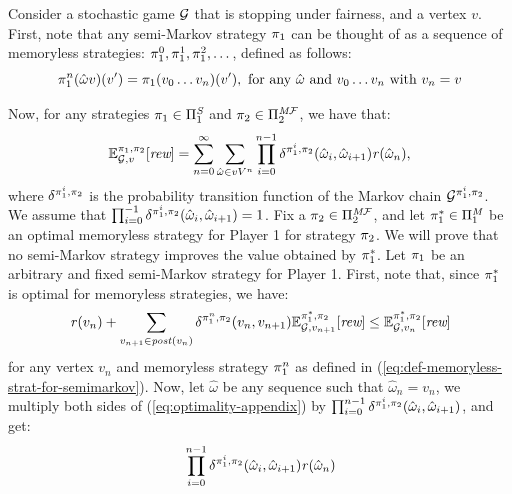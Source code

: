 \begin{myproof}
  Consider a stochastic game $\mathcal{G}$ that is stopping under fairness, and a vertex $v$. First, note that any semi-Markov strategy $\pi_{1}$ can be thought of as a  sequence of memoryless strategies: $\pi_{1}^{0},\pi_{1}^{1},\pi_{1}^{2}, \dots$,  defined as follows:
  \begin{equation}\label{eq:def-memoryless-strat-for-semimarkov}
    \pi_{1}^{n}(\hat{\omega}v)(v') = \pi_{1}(v_0 \dots v_n)(v'), \text{ for any $\hat{\omega}$ and $v_0 \dots v_n$ with $v_n = v$}
  \end{equation}

  Now,  for any strategies $\pi_{1} \in \Pi^{\textit{S}}_{1}$ and $\pi_{2} \in \Pi^{\textit{M}\mathcal{F}}_{2}$, we have that:
  \[
  \mathbb{E}^{\pi_{1}, \pi_{2}}_{\mathcal{G},v}[\textit{rew}] = 
  \sum^\infty_{n=0} \sum_{\hat{\omega} \in vV^n} \prod^{n-1}_{i=0} \delta^{\pi_{1}^i,\pi_{2}}(\hat{\omega}_i, \hat{\omega}_{i+1}) \mathit{r}(\hat{\omega}_n),
  \]
  where $\delta^{\pi_{1}^i,\pi_{2}}$ is the probability transition function of the Markov chain $\mathcal{G}^{\pi_{1}^i,\pi_{2}}$.  We assume that $\prod^{-1}_{i=0} \delta^{\pi_{1}^i,\pi_{2}}(\hat{\omega}_i, \hat{\omega}_{i+1}) = 1$.
  Fix a $\pi_{2} \in \Pi^{\textit{M}\mathcal{F}}_{2}$, and let $\pi^*_{1} \in \Pi^{\textit{M}}_{1}$ be an optimal memoryless strategy for Player 1  for strategy $\pi_{2}$.
  We will prove that  no semi-Markov  strategy improves the value obtained by $\pi^*_{1}$.  Let $\pi_{1}$ be an arbitrary and fixed semi-Markov strategy for Player 1.  First, note that, since $\pi^*_{1}$ is optimal for memoryless strategies, we have:
  \begin{equation}\label{eq:optimality-appendix}
    \mathit{r}(v_n) + \sum_{v_{n+1} \in \mathit{post}(v_n)} \delta^{\pi_{1}^n,\pi_{2}}(v_n, v_{n+1}) \mathbb{E}^{\pi^*_{1}, \pi_{2}}_{\mathcal{G},v_{n+1}}[\textit{rew}] \leq \mathbb{E}^{\pi^*_{1}, \pi_{2}}_{\mathcal{G},v_n}[\textit{rew}]
  \end{equation}
  for any vertex $v_n$ and memoryless strategy $\pi_{1}^n$ as defined in (\ref{eq:def-memoryless-strat-for-semimarkov}).  Now, let $\hat{\omega}$ be any sequence such that
  $\hat{\omega}_n = v_n$, we multiply both sides of (\ref{eq:optimality-appendix}) by $\prod^{n-1}_{i=0} \delta^{\pi_{1}^i,\pi_{2}}(\hat{\omega}_i,\hat{\omega}_{i+1})$,
  and get:
  \begin{align*}
    & \prod^{n-1}_{i=0}\delta^{\strat{1}^i, \strat{2}}(\hat{\omega}_i, \hat{\omega}_{i+1}) \reward(\hat{\omega}_n) \\

\end{align*}
\end{myproof}
